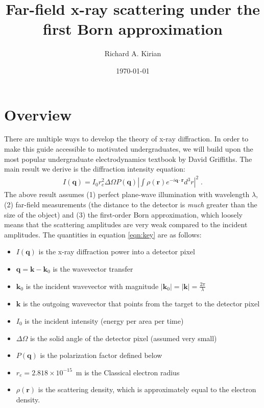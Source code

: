\documentclass[12pt]{article}
\title{Far-field x-ray scattering under the first Born approximation}
\author{Richard A. Kirian}
\date{\today}
\renewcommand{\vec}[1]{\boldsymbol{#1}}
\newcommand{\abs}[1]{\left| #1 \right|}
\begin{document}
\maketitle

\section{Overview}

There are multiple ways to develop the theory of x-ray diffraction.  In order to make this guide 
accessible to motivated undergraduates, we will build upon the most popular
undergraduate electrodynamics textbook by David Griffiths\cite{Griffiths2018}.  The main result we derive is
the diffraction intensity equation:
\begin{align}\label{eqn:key}
    I(\vec{q}) = I_0 r_e^2 \Delta \Omega P(\vec{q})  \abs{\int  \rho(\vec{r}) e^{-i \vec{q}\cdot\vec{r}} d^3 r }^2 \;.
\end{align}
The above result assumes (1) perfect plane-wave illumination with wavelength $\lambda$, (2) far-field measurements (the
distance to the detector is \emph{much} greater than the size of the object)
and (3) the first-order Born approximation, which loosely means that the scattering amplitudes are very weak
compared to the incident amplitudes. The quantities in equation \ref{eqn:key} are as follows:
\begin{itemize}
\item $I(\vec{q})$ is the x-ray diffraction power into a detector pixel
\item $\vec{q}=\vec{k}-\vec{k}_0$ is the wavevector transfer
\item $\vec{k}_0$ is the incident wavevector with magnitude $|\vec{k}_0| = |\vec{k}| = \frac{2\pi}{\lambda}$
\item $\vec{k}$ is the outgoing wavevector that points from the target to the detector pixel
\item $I_0$ is the incident intensity (energy per area per time)
\item $\Delta \Omega$ is the solid angle of the detector pixel (assumed very small)
\item $P(\vec{q})$ is the polarization factor defined below
\item $r_e = 2.818 \times 10^{-15}$~m is the Classical electron radius
\item $\rho(\vec{r})$ is the scattering density, which is approximately equal to the electron density.
\end{itemize}
\end{document}
